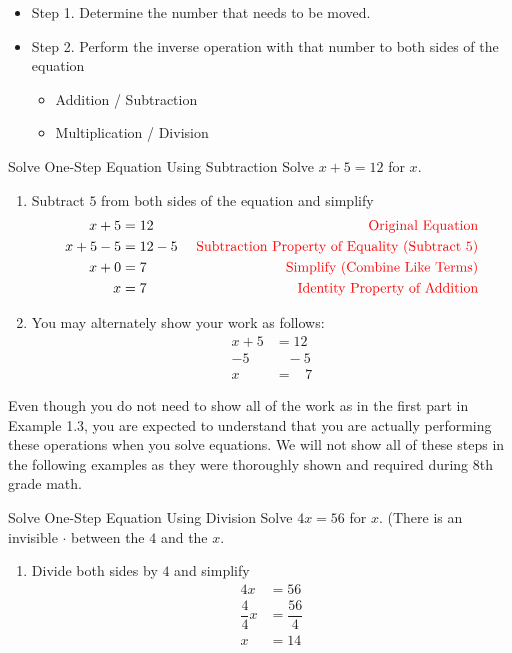 \begin{itemize}
    \item Step 1. Determine the number that needs to be moved.
    \item Step 2. Perform the inverse operation with that number to both sides of the equation
    \begin{itemize}
        \item Addition / Subtraction
        \item Multiplication / Division
    \end{itemize} 
\end{itemize}
\begin{example}{Solve One-Step Equation Using Subtraction}{}
    Solve $x+5=12$ for $x$.
    \begin{enumerate}
        \item[] Subtract $5$ from both sides of the equation and simplify
        \begin{align*}
            x+5&=12&\textcolor{red}{\textrm{   Original Equation}}\\
            x+5-5&=12-5&\textcolor{red}{\textrm{   Subtraction Property of Equality (Subtract 5)}}\\
            x+0&=7 &\textcolor{red}{\textrm{   Simplify (Combine Like Terms)}}\\
            x&=7&\textcolor{red}{\textrm{   Identity Property of Addition}}
        \end{align*}
        \item[] You may alternately show your work as follows:
        \begin{align*}        
            x+5&=12\\
            -5& \;\;\;-5\\
            x&=\;\;\;7
        \end{align*}        
    \end{enumerate}
\end{example}
Even though you do not need to show all of the work as in the first part in Example 1.3, you are expected to understand that you are actually performing these operations when you solve equations. We will not show all of these steps in the following examples as they were thoroughly shown and required during 8th grade math.
\newpage
\begin{example}{Solve One-Step Equation Using Division}{}
    Solve $4x=56$ for $x$. (There is an invisible $\cdot$ between the $4$ and the $x$.
    \begin{enumerate}
        \item[] Divide both sides by $4$ and simplify
        \begin{align*}        
            4x&=56\\
            \dfrac{4}{4}x&=\dfrac{56}{4}\\
            x&=14
        \end{align*}        
    \end{enumerate}
\end{example}
